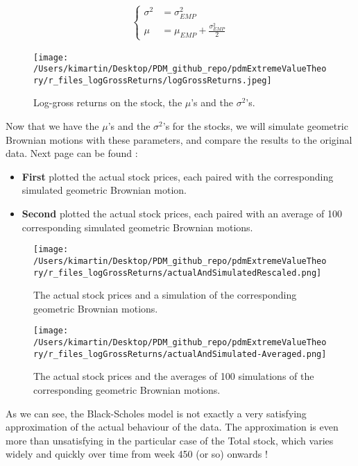 \begin{equation}
\begin{alignat*}{2}
\begin{cases} \sigma^2 &= \sigma_{EMP}^2\\
\mu &= \mu_{EMP} + \frac{\sigma_{EMP}^2}{2} \end{cases}
\end{alignat*}
\end{equation}\newline	
\newpage
\begin{figure}[h!]
	\centering
		\texttt{[image: /Users/kimartin/Desktop/PDM\_github\_repo/pdmExtremeValueTheory/r\_files\_logGrossReturns/logGrossReturns.jpeg]}
		\caption{Log-gross returns on the stock, the $\mu$'s and the $\sigma^2$'s.}
		\label{fig:LogGrossReturns}
\end{figure}
Now that we have the $\mu$'s and the $\sigma^2$'s for the stocks, we will simulate geometric Brownian motions with these parameters, and compare the results to the original data. Next page can be found :
\begin{itemize}
	\item \textbf{First} plotted the actual stock prices, each paired with the corresponding simulated geometric Brownian motion.
	\item \textbf{Second} plotted the actual stock prices, each paired with an average of 100 corresponding simulated geometric Brownian motions.
\end{itemize}
\begin{figure}[h!]
	\centering
	\texttt{[image: /Users/kimartin/Desktop/PDM\_github\_repo/pdmExtremeValueTheory/r\_files\_logGrossReturns/actualAndSimulatedRescaled.png]}
	\caption{The actual stock prices and a simulation of the corresponding geometric Brownian motions.}
	\label{fig:ActualAndSimulatedGeomBMs}
\end{figure}
\newpage
\begin{figure}[h!]
	\centering
	\texttt{[image: /Users/kimartin/Desktop/PDM\_github\_repo/pdmExtremeValueTheory/r\_files\_logGrossReturns/actualAndSimulated-Averaged.png]}
	\caption{The actual stock prices and the averages of 100 simulations of the corresponding geometric Brownian motions.}
	\label{fig:ActualAndManySimulatedGeomBMs}
\end{figure}
As we can see, the Black-Scholes model is not exactly a very satisfying approximation of the actual behaviour of the data. The approximation is even more than unsatisfying in the particular case of the Total stock, which varies widely and quickly over time from week 450 (or so) onwards !



